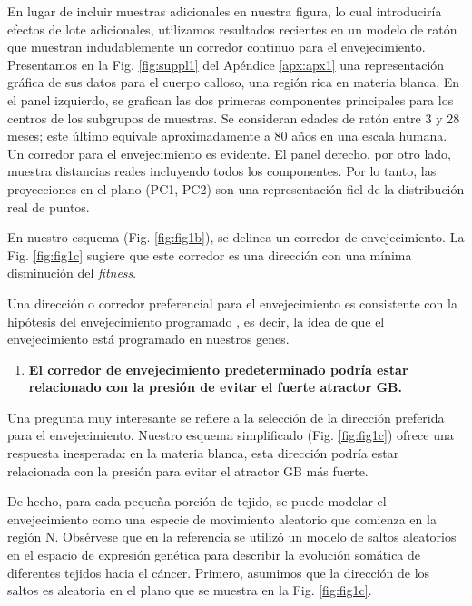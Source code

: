 En lugar de incluir muestras adicionales en nuestra figura, lo cual introduciría efectos de lote adicionales, utilizamos resultados recientes en un modelo de ratón \cite{hahn2023atlas} que muestran indudablemente un corredor continuo para el envejecimiento. Presentamos en la Fig. \ref{fig:suppl1} del Apéndice \ref{apx:apx1} una representación gráfica de sus datos para el cuerpo calloso, una región rica en materia blanca. En el panel izquierdo, se grafican las dos primeras componentes principales para los centros de los subgrupos de muestras. Se consideran edades de ratón entre 3 y 28 meses; este último equivale aproximadamente a 80 años en una escala humana. Un corredor para el envejecimiento es evidente. El panel derecho, por otro lado, muestra distancias reales incluyendo todos los componentes. Por lo tanto, las proyecciones en el plano (PC1, PC2) son una representación fiel de la distribución real de puntos.

En nuestro esquema (Fig. \ref{fig:fig1b}), se delinea un corredor de envejecimiento. La Fig. \ref{fig:fig1c} sugiere que este corredor es una dirección con una mínima disminución del \textit{fitness}.

Una dirección o corredor preferencial para el envejecimiento es consistente con la hipótesis del envejecimiento programado \cite{Magalh_es_2012, Gems_2022}, es decir, la idea de que el envejecimiento está programado en nuestros genes.

\begin{enumerate}
	\item[4.] \textbf{El corredor de envejecimiento predeterminado podría estar relacionado con la presión de evitar el fuerte atractor GB.}
\end{enumerate}

Una pregunta muy interesante se refiere a la selección de la dirección preferida para el envejecimiento. Nuestro esquema simplificado (Fig. \ref{fig:fig1c}) ofrece una respuesta inesperada: en la materia blanca, esta dirección podría estar relacionada con la presión para evitar el atractor GB más fuerte.

De hecho, para cada pequeña porción de tejido, se puede modelar el envejecimiento como una especie de movimiento aleatorio que comienza en la región N. Obsérvese que en la referencia \cite{Herrero_2022} se utilizó un modelo de saltos aleatorios en el espacio de expresión genética para describir la evolución somática de diferentes tejidos hacia el cáncer. Primero, asumimos que la dirección de los saltos es aleatoria en el plano que se muestra en la Fig. \ref{fig:fig1c}.

